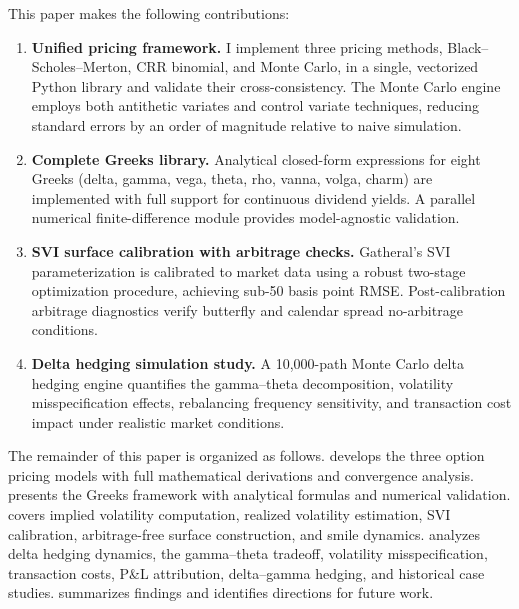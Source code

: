 \documentclass[11pt,a4paper]{article}
\begin{document}
This paper makes the following contributions:

\begin{enumerate}[label=(\roman*)]
    \item \textbf{Unified pricing framework.} I implement three pricing methods, Black--Scholes--Merton, CRR binomial, and Monte Carlo, in a single, vectorized Python library and validate their cross-consistency. The Monte Carlo engine employs both antithetic variates and control variate techniques, reducing standard errors by an order of magnitude relative to naive simulation.

    \item \textbf{Complete Greeks library.} Analytical closed-form expressions for eight Greeks (delta, gamma, vega, theta, rho, vanna, volga, charm) are implemented with full support for continuous dividend yields. A parallel numerical finite-difference module provides model-agnostic validation.

    \item \textbf{SVI surface calibration with arbitrage checks.} Gatheral's SVI parameterization is calibrated to market data using a robust two-stage optimization procedure, achieving sub-50 basis point RMSE. Post-calibration arbitrage diagnostics verify butterfly and calendar spread no-arbitrage conditions.

    \item \textbf{Delta hedging simulation study.} A 10,000-path Monte Carlo delta hedging engine quantifies the gamma--theta decomposition, volatility misspecification effects, rebalancing frequency sensitivity, and transaction cost impact under realistic market conditions.
\end{enumerate}

The remainder of this paper is organized as follows.  develops the three option pricing models with full mathematical derivations and convergence analysis.  presents the Greeks framework with analytical formulas and numerical validation.  covers implied volatility computation, realized volatility estimation, SVI calibration, arbitrage-free surface construction, and smile dynamics.  analyzes delta hedging dynamics, the gamma--theta tradeoff, volatility misspecification, transaction costs, P\&L attribution, delta--gamma hedging, and historical case studies.  summarizes findings and identifies directions for future work.


\end{document}
